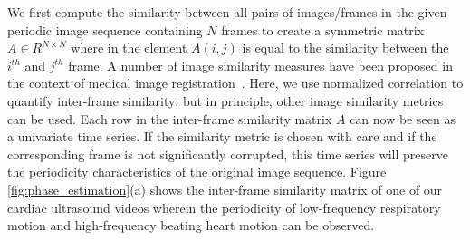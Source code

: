 \documentclass[journal]{IEEEtran}
\begin{document}
	We first compute the similarity between all pairs of images/frames in the given periodic image sequence containing $N$ frames to create a symmetric matrix $A \in R^{N \times N}$ where in the element $A(i,j)$ is equal to the similarity between the $i^{th}$ and $j^{th}$ frame. A number of image similarity measures have been proposed in the context of medical image registration~\cite{Yoo2004}.
Here, we use normalized correlation to quantify inter-frame similarity; but in principle, other image similarity metrics can be used. Each row in the inter-frame similarity matrix $A$ can now be seen as a univariate time series. If the similarity metric is chosen with care and if the corresponding frame is not significantly corrupted, this time series will preserve the periodicity characteristics of the original image sequence. Figure \ref{fig:phase_estimation}(a) shows the inter-frame similarity matrix of one of our cardiac ultrasound videos wherein the periodicity of low-frequency respiratory motion and high-frequency beating heart motion can be observed. 
%
\end{document}
